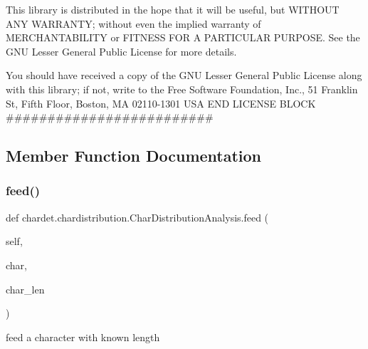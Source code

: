 This library is distributed in the hope that it will be useful, but W\+I\+T\+H\+O\+UT A\+NY W\+A\+R\+R\+A\+N\+TY; without even the implied warranty of M\+E\+R\+C\+H\+A\+N\+T\+A\+B\+I\+L\+I\+TY or F\+I\+T\+N\+E\+SS F\+OR A P\+A\+R\+T\+I\+C\+U\+L\+AR P\+U\+R\+P\+O\+SE. See the G\+NU Lesser General Public License for more details.

You should have received a copy of the G\+NU Lesser General Public License along with this library; if not, write to the Free Software Foundation, Inc., 51 Franklin St, Fifth Floor, Boston, MA 02110-\/1301 U\+SA E\+ND L\+I\+C\+E\+N\+SE B\+L\+O\+CK \#\#\#\#\#\#\#\#\#\#\#\#\#\#\#\#\#\#\#\#\#\#\#\#\# 

\subsection{Member Function Documentation}
\mbox{\label{classchardet_1_1chardistribution_1_1_char_distribution_analysis_a406ad518b489485f9a21f2cce386cb7d}} 
\subsubsection{\texorpdfstring{feed()}{feed()}}
{\footnotesize\ttfamily def chardet.\+chardistribution.\+Char\+Distribution\+Analysis.\+feed (\begin{DoxyParamCaption}\item[{}]{self,  }\item[{}]{char,  }\item[{}]{char\+\_\+len }\end{DoxyParamCaption})}

\begin{DoxyVerb}feed a character with known length\end{DoxyVerb}
 \mbox{\label{classchardet_1_1chardistribution_1_1_char_distribution_analysis_a8b424ad3e45aaeb46e48a3e49ec5f535}} 
